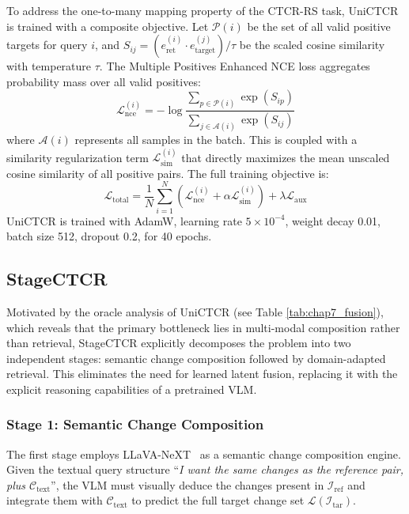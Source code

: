 To address the one-to-many mapping property of the
CTCR-RS task, UniCTCR is trained with a composite
objective. Let $\mathcal{P}(i)$ be the set of all valid
positive targets for query $i$, and $S_{ij} =
(e_\text{ret}^{(i)} \cdot e_\text{target}^{(j)}) / \tau$
be the scaled cosine similarity with temperature $\tau$.
The Multiple Positives Enhanced NCE loss aggregates
probability mass over all valid positives:
\begin{equation}
    \mathcal{L}_\text{nce}^{(i)} = -\log
    \frac{\sum_{p \in \mathcal{P}(i)} \exp(S_{ip})}
    {\sum_{j \in \mathcal{A}(i)} \exp(S_{ij})}
    \label{eq:mpnce}
\end{equation}
where $\mathcal{A}(i)$ represents all samples in the
batch. This is coupled with a similarity regularization
term $\mathcal{L}_\text{sim}^{(i)}$ that directly maximizes
the mean unscaled cosine similarity of all positive pairs.
The full training objective is:
\begin{equation}
    \mathcal{L}_\text{total} = \frac{1}{N}
    \sum_{i=1}^N \left(
    \mathcal{L}_\text{nce}^{(i)} +
    \alpha \mathcal{L}_\text{sim}^{(i)}
    \right) + \lambda \mathcal{L}_\text{aux}
    \label{eq:unictr_loss}
\end{equation}
UniCTCR is trained with AdamW, learning rate $5 \times
10^{-4}$, weight decay 0.01, batch size 512, dropout 0.2,
for 40 epochs.
 
\subsection{StageCTCR}
\label{sec:chap7_stagectcr}
 
Motivated by the oracle analysis of UniCTCR (see Table \ref{tab:chap7_fusion}), which reveals
that the primary bottleneck lies in multi-modal composition
rather than retrieval, StageCTCR explicitly decomposes the
problem into two independent stages: semantic change
composition followed by domain-adapted retrieval. This
eliminates the need for learned latent fusion, replacing it
with the explicit reasoning capabilities of a pretrained
VLM.
 
\subsubsection{Stage 1: Semantic Change Composition}
\label{sec:chap7_stage1}
 
The first stage employs LLaVA-NeXT~\cite{liu2024llavanext}
as a semantic change composition engine. Given the textual
query structure ``\textit{I want the same changes as the
reference pair, plus $\mathcal{C}_\text{text}$}'', the VLM
must visually deduce the changes present in
$\mathcal{I}_\text{ref}$ and integrate them with
$\mathcal{C}_\text{text}$ to predict the full target change
set $\mathcal{L}(\mathcal{I}_\text{tar})$.
 
